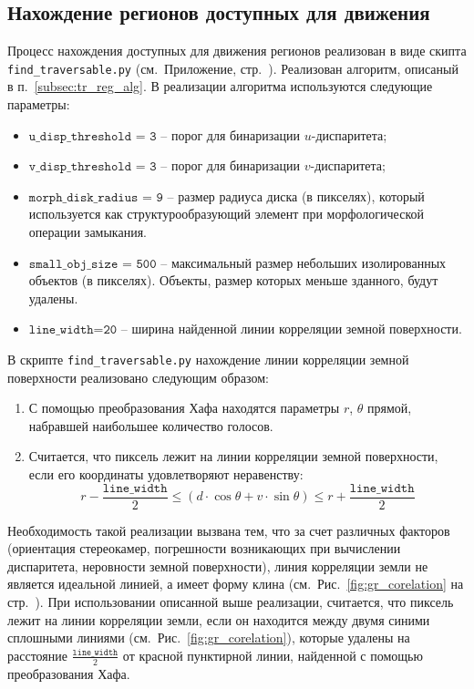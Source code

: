 \documentclass[oneside,final,12pt]{scrartcl}
\begin{document}
		\subsection{Нахождение регионов доступных для движения}
			Процесс нахождения доступных для движения регионов реализован в виде скипта \texttt{find\_traversable.py} (см.~Приложение, стр.~\pageref{app:find_traversable}). Реализован алгоритм, описаный в п.~\ref{subsec:tr_reg_alg}. В реализации алгоритма используются следующие параметры:
			\begin{itemize}
				\item \(\texttt{u\_disp\_threshold = 3}\) -- порог для бинаризации \(u\)-диспаритета;

				\item \(\texttt{v\_disp\_threshold = 3}\) --  порог для бинаризации \(v\)-диспаритета;

				\item \(\texttt{morph\_disk\_radius = 9}\) -- размер радиуса диска (в пикселях), который используется как структурообразующий элемент при морфологической операции замыкания.

				\item \(\texttt{small\_obj\_size = 500}\) -- максимальный размер небольших изолированных объектов (в пикселях). Объекты, размер которых меньше зданного, будут удалены.

				\item \(\texttt{line\_width=20}\) -- ширина найденной линии корреляции земной поверхности.
			\end{itemize}

			В скрипте \texttt{find\_traversable.py} нахождение линии корреляции земной поверхности реализовано следующим образом:
			\begin{enumerate}
				\item С помощью преобразования Хафа находятся параметры \(r\), \(\theta\) прямой, набравшей наибольшее количество голосов.

				\item Считается, что пиксель лежит на линии корреляции земной поверхности, если его координаты удовлетворяют неравенству:
				\[r-\frac{\texttt{line\_width}}{2} \leq \left(d \cdot \cos{\theta} + v \cdot \sin{\theta}\right) \leq r + \frac{\texttt{line\_width}}{2} \]
			\end{enumerate}
			Необходимость такой реализации вызвана тем, что за счет различных факторов (ориентация стереокамер, погрешности возникающих при вычислении диспаритета, неровности земной поверхности), линия корреляции земли не является идеальной линией, а имеет форму клина  (см.~Рис.~\ref{fig:gr_corelation} на стр.~\pageref{fig:gr_corelation}). При использовании описанной выше реализации, считается, что пиксель лежит на линии корреляции земли, если он находится между двумя синими сплошными линиями (см.~Рис.~\ref{fig:gr_corelation}), которые удалены на расстояние \(\frac{\texttt{line\_width}}{2}\) от красной пунктирной линии, найденной с помощью преобразования Хафа.
\end{document}
